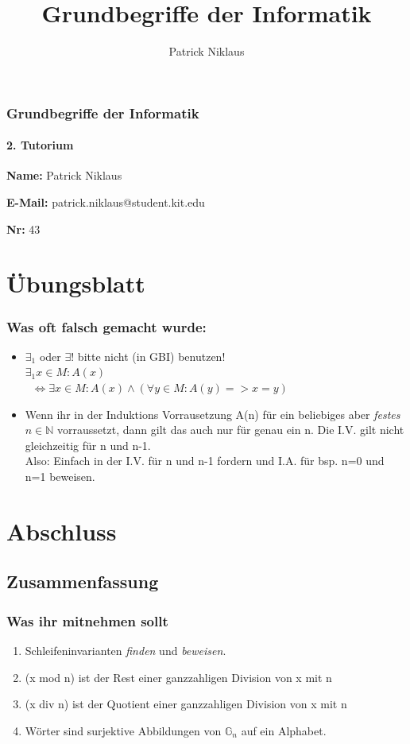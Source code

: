 \documentclass{beamer}
\title{Grundbegriffe der Informatik}
\author{Patrick Niklaus}
\begin{document}
\begin{frame}
  \frametitle{Grundbegriffe der Informatik}
  \framesubtitle{2. Tutorium}
  \begin{description}
    \item \textbf{Name:} Patrick Niklaus
    \item \textbf{E-Mail:} patrick.niklaus@student.kit.edu
    \item \textbf{Nr:} 43
  \end{description}
\end{frame}

\section{Übungsblatt}
\begin{frame}
  \frametitle{Was oft falsch gemacht wurde:}
  \begin{itemize}
    \item ${\exists}_1$ oder $\exists !$ bitte nicht (in GBI) benutzen!\\
          ${\exists}_1 x \in M: A(x)$\\
          $\;\;\Leftrightarrow \exists x \in M: A(x) \wedge (\forall y \in M: A(y) => x = y)$
    \item Wenn ihr in der Induktions Vorrausetzung A(n) für ein beliebiges aber \emph{festes} $n \in \mathbb{N}$ vorraussetzt, dann gilt das auch nur für genau ein n. Die I.V. gilt nicht gleichzeitig für n und n-1.\\
     Also: Einfach in der I.V. für n und n-1 fordern und I.A. für bsp. n=0 und n=1 beweisen.
  \end{itemize}
\end{frame}






\section{Abschluss}
\subsection{Zusammenfassung}
\begin{frame}
  \frametitle{Was ihr mitnehmen sollt}
  \begin{enumerate}
    \item Schleifeninvarianten \emph{finden} und \emph{beweisen}.
    \item (x mod n) ist der Rest einer ganzzahligen Division von x mit n
    \item (x div n) ist der Quotient einer ganzzahligen Division von x mit n
    \item Wörter sind surjektive Abbildungen von $\mathbb{G}_n$ auf ein Alphabet.
   \end{enumerate}
\end{frame}
\end{document}
